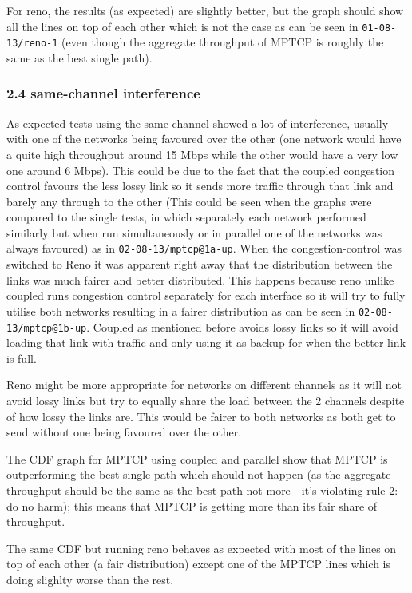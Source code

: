 \documentclass[12pt,a4paper]{article}
\begin{document}
For reno, the results (as expected) are slightly better, but the graph should
show all the lines on top of each other which is not the case as can be seen in
\texttt{01-08-13/reno-1} (even though the aggregate throughput of MPTCP is
roughly the same as the best single path).

\subsubsection{2.4 same-channel interference}
As expected tests using the same channel showed a lot of interference, usually
with one of the networks being favoured over the other (one network would have a
quite high throughput around 15 Mbps while the other would have a very low one
around 6 Mbps). This could be due to the fact that the coupled congestion
control favours the less lossy link so it sends more traffic through that link
and barely any through to the other (This could be seen when the graphs were
compared to the single tests, in which separately each network performed
similarly but when run simultaneously or in parallel one of the networks was
always favoured) as in \texttt{02-08-13/mptcp@1a-up}. When the
congestion-control was switched to Reno it was apparent right away that the
distribution between the links was much fairer and better distributed. This
happens because reno unlike coupled runs congestion control separately for each
interface so it will try to fully utilise both networks resulting in a fairer
distribution as can be seen in \texttt{02-08-13/mptcp@1b-up}. Coupled as
mentioned before avoids lossy links so it will avoid loading that link with
traffic and only using it as backup for when the better link is full.

Reno might be more appropriate for networks on different channels as it will not
avoid lossy links but try to equally share the load between the 2 channels
despite of how lossy the links are. This would be fairer to both networks as
both get to send without one being favoured over the other.

The CDF graph for MPTCP using coupled and parallel show that MPTCP is
outperforming the best single path which should not happen (as the aggregate
throughput should be the same as the best path not more - it's violating rule 2:
do no harm); this means that MPTCP is getting more than its fair share of
throughput.

The same CDF but running reno behaves as expected with most of the lines on top
of each other (a fair distribution) except one of the MPTCP lines which is doing
slighlty worse than the rest.
\end{document}
